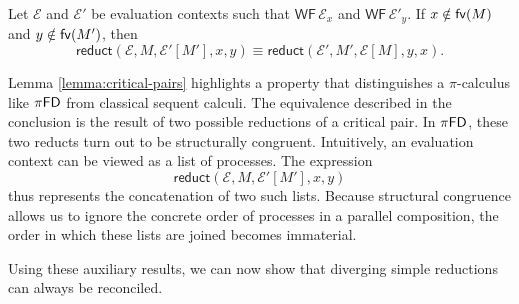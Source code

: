 \begin{lemma} \label{lemma:critical-pairs}
  Let $\mathcal{E}$ and $\mathcal{E}'$ be evaluation contexts such that
  $\mathsf{WF} \, \mathcal{E}_x$ and $\mathsf{WF} \, \mathcal{E}'_y$.
  If $x \notin \mathsf{fv}(M)$ and $y \notin \mathsf{fv}(M')$, then
  \[
    \mathsf{reduct}(\mathcal{E}, M, \mathcal{E}'[M'], x, y) \equiv
    \mathsf{reduct}(\mathcal{E}', M', \mathcal{E}[M], y, x).
  \]
\end{lemma}

\begin{remark}
  Lemma \ref{lemma:critical-pairs} highlights a property that distinguishes a $\pi$-calculus
  like $\pi\textsf{FD}$ from classical sequent calculi.
  The equivalence described in the conclusion
  is the result of two possible reductions of a critical pair. In $\pi\textsf{FD}$,
  these two reducts turn out to be structurally congruent. Intuitively, an evaluation context
  can be viewed as a list of processes. The expression
  \[
    \mathsf{reduct}(\mathcal{E}, M, \mathcal{E}'[M'], x, y)
  \]
  thus represents the concatenation of two such lists.
  Because structural congruence allows us to ignore the concrete order of processes in
  a parallel composition, the order in which these lists are joined becomes immaterial.
\end{remark}

Using these auxiliary results, we can now show that diverging simple reductions
can always be reconciled.

